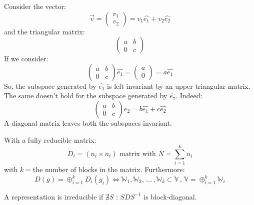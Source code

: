\documentclass[../../main/main.tex]{subfiles}
\begin{document}
\begin{example}
Consider the vector:
\begin{equation*}
\vec{v} = \begin{pmatrix} 	v_1	\\	v_2	\end{pmatrix} = v_1 \widehat{e_1} + v_2 \widehat{e_2}
\end{equation*}
and the triangular matrix:
\begin{equation*}
\begin{pmatrix} 	a & b	\\	0 & c	\end{pmatrix}
\end{equation*}
If we consider:
\begin{equation*}
\begin{pmatrix} 	a & b	\\	0 & c	\end{pmatrix} \widehat{e_1} = \begin{pmatrix} 	a	\\ 0	\end{pmatrix} = a \widehat{e_1}
\end{equation*}
So, the subspace generated by $\widehat{e_1}$ is left invariant by an upper triangular matrix. The same doesn't hold for the subspace generated by $\widehat{e_2}$. Indeed:
\begin{equation*}
\begin{pmatrix} 	a & b	\\	0 & c	\end{pmatrix} \widehat{e_2} = b \widehat{e_1} + c \widehat{e_2}
\end{equation*}
A diagonal matrix leaves both the subspaces invariant.
\end{example}
With a fully reducible matrix:
\begin{equation*}
D_{i}=(n_i \times n_i) \text{ matrix with } N=\sum_{i=1}^k n_i
\end{equation*}
with $k=$the number of blocks in the matrix. Furthermore:
\begin{equation*}
D(g) = \oplus_{i=1}^k D_i(g_i) \iff \mathbb{W}_1 , \mathbb{W}_2 , \, ... \, , \mathbb{W}_k \subset \mathbb{V} \, , \, \mathbb{V} = \oplus_{i=1}^k \mathbb{W}_i
\end{equation*}

\begin{definition}
A representation is irreducible if $\nexists S$ : $SDS^{-1}$ is block-diagonal.
\end{definition}
\end{document}
